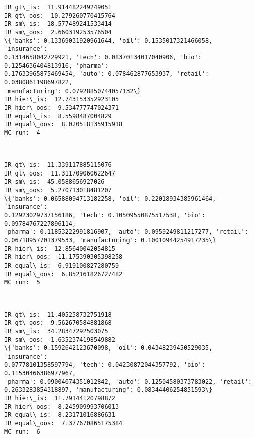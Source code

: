 \documentclass[11pt]{article}
\begin{document}
    \begin{Verbatim}[commandchars=\\\{\},fontsize=\footnotesize]
IR gt\_is:  11.914482249249051
IR gt\_oos:  10.279260770415764
IR sm\_is:  18.577489241533414
IR sm\_oos:  2.660319253576504
\{'banks': 0.13369031920961644, 'oil': 0.1535017321466058, 'insurance':
0.1314658042729921, 'tech': 0.08370134017040906, 'bio': 0.1254636404813916, 'pharma':
0.17633965875469454, 'auto': 0.078462877653937, 'retail': 0.0380861198697822,
'manufacturing': 0.07928850744057132\}
IR hier\_is:  12.743153352923105
IR hier\_oos:  9.534777747024371
IR equal\_is:  8.5598487004829
IR equal\_oos:  8.020518135915918
MC run:  4

    \end{Verbatim}

    \begin{center}
    \end{center}
    { \hspace*{\fill} \\}
    
    \begin{Verbatim}[commandchars=\\\{\},fontsize=\footnotesize]
IR gt\_is:  11.339117885115076
IR gt\_oos:  11.311709060622647
IR sm\_is:  45.0588656927026
IR sm\_oos:  5.270713018481207
\{'banks': 0.06588094713182258, 'oil': 0.22018934385961464, 'insurance':
0.12923029737156186, 'tech': 0.10509550875517538, 'bio': 0.09784767227896114,
'pharma': 0.11853222991816907, 'auto': 0.0959249811217277, 'retail':
0.06718957701379533, 'manufacturing': 0.10010944254917235\}
IR hier\_is:  12.85640042054815
IR hier\_oos:  11.175390305398258
IR equal\_is:  6.919100827280759
IR equal\_oos:  6.852161826727482
MC run:  5

    \end{Verbatim}

    \begin{center}
    \end{center}
    { \hspace*{\fill} \\}
    
    \begin{Verbatim}[commandchars=\\\{\},fontsize=\footnotesize]
IR gt\_is:  11.405258732751918
IR gt\_oos:  9.562670584881868
IR sm\_is:  34.28347292503075
IR sm\_oos:  1.6352374198549882
\{'banks': 0.1592642123670098, 'oil': 0.04348239450529035, 'insurance':
0.07778101358597794, 'tech': 0.04230872044357792, 'bio': 0.11530466386977967,
'pharma': 0.09004074351012842, 'auto': 0.12504580373783022, 'retail':
0.2633283854318897, 'manufacturing': 0.08344406254851593\}
IR hier\_is:  11.79144120798872
IR hier\_oos:  8.245909993706013
IR equal\_is:  8.23171016886631
IR equal\_oos:  7.377670865175384
MC run:  6

    \end{Verbatim}
\end{document}

